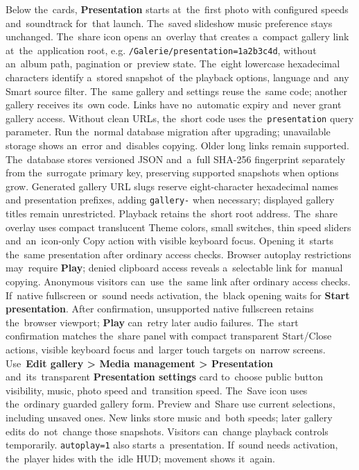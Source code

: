 \documentclass[11pt,a4paper]{article}
\newcommand{\ui}[1]{\textbf{#1}}
\newcommand{\codeword}[1]{\nolinkurl{#1}}
\begin{document}
Below the~cards, \ui{Presentation} starts at~the~first photo with configured
speeds and~soundtrack for~that launch. The~saved slideshow music preference
stays
unchanged. The~share icon opens an~overlay that creates a~compact gallery link
at~the~application root, e.g. \codeword{/Galerie/presentation=1a2b3c4d},
without an~album path, pagination or~preview state.
The~eight lowercase hexadecimal characters identify a~stored snapshot of~the
playback options, language and~any Smart source filter. The~same gallery and
settings reuse the~same code; another gallery receives its~own code.
Links have no~automatic expiry and~never grant gallery access.
Without clean URLs, the~short code uses the~\codeword{presentation} query
parameter.
Run the~normal database migration after upgrading; unavailable storage shows
an~error and~disables copying. Older long links remain supported.
The~database stores versioned JSON and~a~full SHA-256 fingerprint separately
from the~surrogate primary key, preserving supported snapshots when options
grow.
Generated gallery URL slugs reserve eight-character hexadecimal names and
presentation prefixes, adding \codeword{gallery-} when necessary; displayed
gallery titles remain unrestricted. Playback retains the~short root address.
The~share overlay uses compact translucent Theme colors, small switches,
thin speed sliders and~an~icon-only Copy action with visible keyboard focus.
Opening it~starts the~same presentation after ordinary access checks.
Browser autoplay restrictions may~require \ui{Play}; denied clipboard
access reveals a~selectable link for~manual copying.
Anonymous visitors can~use~the~same link after ordinary access checks.
If~native fullscreen or~sound needs activation, the~black opening waits for
\ui{Start presentation}. After confirmation, unsupported native fullscreen
retains the~browser viewport; \ui{Play} can~retry later audio failures.
The~start confirmation matches the~share panel with compact transparent
Start/Close actions, visible keyboard focus and~larger touch targets
on~narrow screens.
Use~\ui{Edit gallery > Media management > Presentation} and~its~transparent
\ui{Presentation settings} card to~choose public button visibility, music,
photo speed and~transition speed. The~Save icon uses the~ordinary guarded
gallery form. Preview and~Share use current selections, including unsaved ones.
New links store music and~both speeds; later gallery edits do~not~change
those snapshots. Visitors can~change playback controls temporarily.
\codeword{autoplay=1} also starts a~presentation. If~sound needs activation,
the~player hides with the~idle HUD; movement shows it~again.
\end{document}
